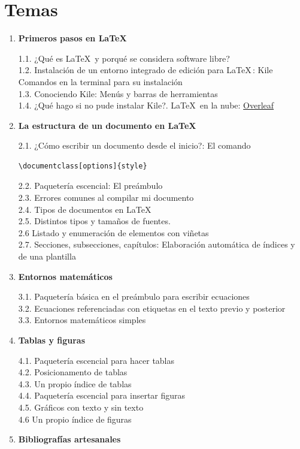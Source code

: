 \documentclass[12pt]{article}
\begin{document}
\section*{Temas}
\begin{enumerate}
\item \textbf{\large {Primeros pasos en \LaTeX}}
\vspace{5mm}

1.1. ¿Qué es \LaTeX\, y porqué se considera software libre?\\
1.2. Instalación de un entorno integrado de edición para \LaTeX \,: Kile Comandos en la terminal para su instalación\\
1.3. Conociendo Kile: Menús y barras de herramientas\\
1.4. ¿Qué hago si no pude instalar Kile?. \LaTeX\, en la nube: \href{https://www.overleaf.com/}{Overleaf}\\
\item \textbf{\large {La estructura de un documento en \LaTeX}}
\vspace{5mm}

2.1. ¿Cómo escribir un documento desde el inicio?: El comando 
\begin{lstlisting}
\documentclass[options]{style}
\end{lstlisting}
2.2. Paquetería escencial: El preámbulo\\
2.3. Errores comunes al compilar mi documento\\
2.4. Tipos de documentos en \LaTeX \\
2.5. Distintos tipos y tamaños de fuentes.\\
2.6 Listado y enumeración de elementos con viñetas\\
2.7. Secciones, subsecciones, capítulos: Elaboración automática de índices y de una plantilla
\item \textbf{\large {Entornos matemáticos}}
\vspace{5mm}

3.1. Paquetería básica en el preámbulo para escribir ecuaciones\\
3.2. Ecuaciones referenciadas con etiquetas en el texto previo y posterior\\
3.3. Entornos matemáticos simples 
\pagebreak
\item \textbf{\large {Tablas y figuras}}
\vspace{5mm}

4.1. Paquetería escencial para hacer tablas\\
4.2. Posicionamento de tablas\\
4.3. Un propio índice de tablas\\
4.4. Paquetería escencial para insertar figuras\\
4.5. Gráficos con texto y sin texto\\
4.6  Un propio índice de figuras
\item \textbf{\large {Bibliografías artesanales}}
\vspace{5mm}


\end{enumerate}
\end{document}
